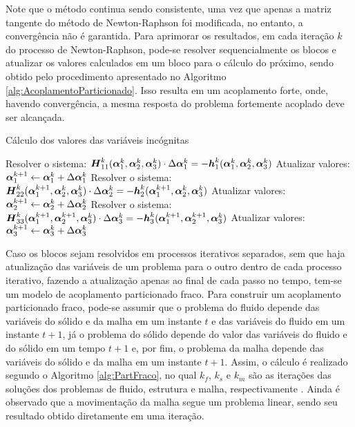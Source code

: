 Note que o método continua sendo consistente, uma vez que apenas a matriz tangente do método de Newton-Raphson foi modificada, no entanto, a convergência não é garantida.
Para aprimorar os resultados, em cada iteração $k$ do processo de Newton-Raphson, pode-se resolver sequencialmente os blocos e atualizar os valores calculados em um bloco para o cálculo do próximo, sendo obtido pelo procedimento apresentado no Algoritmo \ref{alg:AcoplamentoParticionado}. Isso resulta em um acoplamento forte, onde, havendo convergência, a mesma resposta do problema fortemente acoplado deve ser alcançada.


\begin{algorithm}[h!]
    \caption{Cálculo dos valores das variáveis incógnitas}
    \label{alg:AcoplamentoParticionado}
    Resolver o sistema: $\boldsymbol{H}_{11}^k(\boldsymbol{\alpha}_1^k,\boldsymbol{\alpha}_2^k,\boldsymbol{\alpha}_3^k)\cdot\Delta\boldsymbol{\alpha}_1^k=-\boldsymbol{h}_1^k(\boldsymbol{\alpha}_1^k,\boldsymbol{\alpha}_2^k,\boldsymbol{\alpha}_3^k)$\;
    Atualizar valores: $\boldsymbol{\alpha}_1^{k+1}\gets\boldsymbol{\alpha}_1^k+\Delta\boldsymbol{\alpha}_1^k$\;
    Resolver o sistema: $\boldsymbol{H}_{22}^k(\boldsymbol{\alpha}_1^{k+1},\boldsymbol{\alpha}_2^k,\boldsymbol{\alpha}_3^k)\cdot\Delta\boldsymbol{\alpha}_2^k=-\boldsymbol{h}_2^k(\boldsymbol{\alpha}_1^{k+1},\boldsymbol{\alpha}_2^k,\boldsymbol{\alpha}_3^k)$\;
    Atualizar valores: $\boldsymbol{\alpha}_2^{k+1}\gets\boldsymbol{\alpha}_2^k+\Delta\boldsymbol{\alpha}_2^k$\;
    Resolver o sistema: $\boldsymbol{H}_{33}^k(\boldsymbol{\alpha}_1^{k+1},\boldsymbol{\alpha}_2^{k+1},\boldsymbol{\alpha}_3^k)\cdot\Delta\boldsymbol{\alpha}_3^k=-\boldsymbol{h}_3^k(\boldsymbol{\alpha}_1^{k+1},\boldsymbol{\alpha}_2^{k+1},\boldsymbol{\alpha}_3^k)$\;
    Atualizar valores: $\boldsymbol{\alpha}_3^{k+1}\gets\boldsymbol{\alpha}_3^k+\Delta\boldsymbol{\alpha}_3^k$\;
\end{algorithm}


Caso os blocos sejam resolvidos em processos iterativos separados, sem que haja atualização das variáveis de um problema para o outro dentro de cada processo iterativo, fazendo a atualização apenas ao final de cada passo no tempo, tem-se um modelo de acoplamento particionado fraco. Para construir um acoplamento particionado fraco, pode-se assumir que o problema do fluido depende das variáveis do sólido e da malha em um instante $t$ e das variáveis do fluido em um instante $t+1$, já o problema do sólido depende do valor das variáveis do fluido e do sólido em um tempo $t+1$ e, por fim, o problema da malha depende das variáveis do sólido e da malha em um instante $t+1$. Assim, o cálculo é realizado segundo o Algoritmo \ref{alg:PartFraco}, no qual $k_f$, $k_s$ e $k_m$ são as iterações das soluções dos problemas de fluido, estrutura e malha, respectivamente \cite{sanches2022metodos}. Ainda é observado que a movimentação da malha segue um problema linear, sendo seu resultado obtido diretamente em uma iteração.

